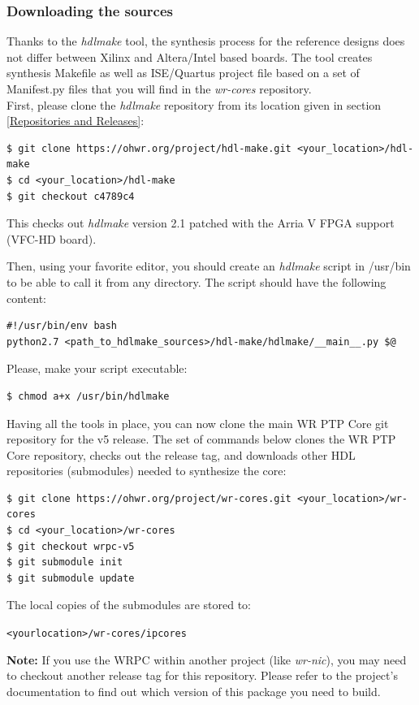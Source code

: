 \documentclass[a4paper, 12pt]{article}
\renewcommand{\_}{\underscore\allowbreak}
\begin{document}
\subsubsection{Downloading the sources}
Thanks to the \textit{hdlmake} tool, the synthesis process for the reference
designs does not differ between Xilinx and Altera/Intel based boards. The tool creates
synthesis Makefile as well as ISE/Quartus project file based on a set of
Manifest.py files that you will find in the \textit{wr-cores} repository.\\

First, please clone the \textit{hdlmake} repository from its location given in
section \ref{Repositories and Releases}:
\begin{lstlisting}
$ git clone https://ohwr.org/project/hdl-make.git <your_location>/hdl-make
$ cd <your_location>/hdl-make
$ git checkout c4789c4
\end{lstlisting}
This checks out \textit{hdlmake} version 2.1 patched with the Arria V FPGA
support (VFC-HD board).

Then, using your favorite editor, you should create an \textit{hdlmake} script in
/usr/bin to be able to call it from any directory. The script should have the
following content:
\begin{lstlisting}
#!/usr/bin/env bash
python2.7 <path_to_hdlmake_sources>/hdl-make/hdlmake/__main__.py $@
\end{lstlisting}

Please, make your script executable:
\begin{lstlisting}
$ chmod a+x /usr/bin/hdlmake
\end{lstlisting}

Having all the tools in place, you can now clone the main WR PTP Core git
repository for the v5 release. The set of commands below clones the WR PTP Core
repository, checks out the release tag, and downloads other HDL repositories
(submodules) needed to synthesize the core:
\begin{lstlisting}
$ git clone https://ohwr.org/project/wr-cores.git <your_location>/wr-cores
$ cd <your_location>/wr-cores
$ git checkout wrpc-v5
$ git submodule init
$ git submodule update
\end{lstlisting}

The local copies of the submodules are stored to:

\texttt{<your\_location>/wr-cores/ip\_cores}

\vspace{1em}
\textbf{Note:} If you use the WRPC within another project (like
\textit{wr-nic}), you may need to checkout another release tag for this
repository. Please refer to the project's documentation to find out which
version of this package you need to build.
\end{document}
